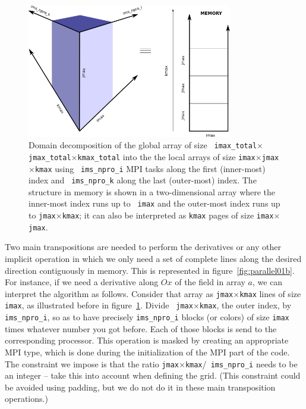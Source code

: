 \begin{figure}[!ht]
\begin{centering}
\includegraphics[width=0.8\textwidth]{figs/parallel01a.png}
\caption{Domain decomposition of the global array of size {\tt
    imax\_total}$\times${\tt jmax\_total}$\times${\tt kmax\_total} into the the
  local arrays of size {\tt imax}$\times${\tt jmax}$\times${\tt kmax} using {\tt
  ims\_npro\_i} MPI tasks along the first (inner-most) index and {\tt
  ims\_npro\_k} along the last (outer-most) index. The structure in memory is
  shown in a two-dimensional array where the inner-most index runs up to {\tt
  imax} and the outer-most index runs up to {\tt jmax}$\times${\tt kmax}; it can
  also be interpreted as {\tt kmax} pages of size {\tt imax}$\times${\tt jmax}.}
\label{fig:parallel01a}
\end{centering}
\end{figure}

Two main transpositions are needed to perform the derivatives or any other
implicit operation in which we only need a set of complete lines along the
desired direction contiguously in memory. This is represented in
figure~\ref{fig:parallel01b}. For instance, if we need a derivative along $Ox$
of the field in array $a$, we can interpret the algorithm as follows. Consider
that array as {\tt jmax}$\times${\tt kmax} lines of size {\tt imax}, as
illustrated before in figure~\ref{fig:parallel01a}. Divide {\tt
jmax}$\times${\tt kmax}, the outer index, by {\tt ims\_npro\_i}, so as to have
precisely {\tt ims\_npro\_i} blocks (or colors) of size {\tt imax} times
whatever number you got before. Each of those blocks is send to the
corresponding processor. This operation is masked by creating an appropriate MPI
type, which is done during the initialization of the MPI part of the code. The
constraint we impose is that the ratio {\tt jmax}$\times${\tt kmax}/{\tt
ims\_npro\_i} needs to be an integer -- take this into account when defining the
grid. (This constraint could be avoided using padding, but we do not do it in
these main transposition operations.)

